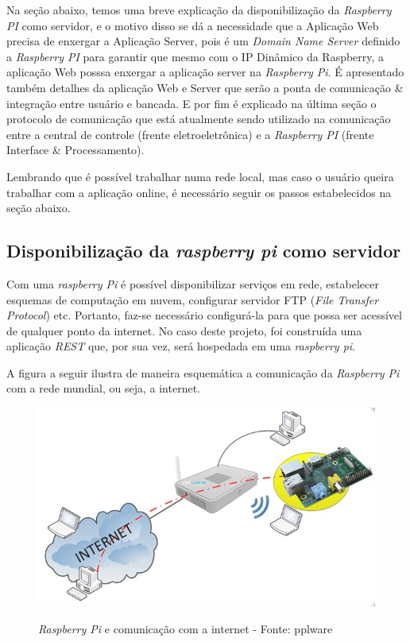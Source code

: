 Na seção abaixo, temos uma breve explicação da disponibilização da \textit{Raspberry PI} como servidor, e o motivo disso se dá a necessidade que a Aplicação Web precisa de enxergar a Aplicação Server, pois é um \textit{Domain Name Server} definido a \textit{Raspberry PI} para garantir que mesmo com o IP Dinâmico da Raspberry, a aplicação Web posssa enxergar a aplicação server na \textit{Raspberry Pi}. É apresentado também detalhes da aplicação Web e Server que serão a ponta de comunicação \& integração entre usuário e bancada. E por fim é explicado na última seção o protocolo de comunicação que está atualmente sendo utilizado na comunicação entre a central de controle (frente eletroeletrônica) e a \textit{Raspberry PI} (frente Interface \& Processamento).

Lembrando que é possível trabalhar numa rede local, mas caso o usuário queira trabalhar com a aplicação online, é necessário seguir os passos estabelecidos na seção abaixo.

\subsection{Disponibilização da \textit{raspberry pi} como servidor}

Com uma \textit{raspberry Pi} é possível disponibilizar serviços em rede, estabelecer esquemas de computação em nuvem, configurar servidor FTP (\textit{File Transfer Protocol}) etc. Portanto, faz-se necessário configurá-la para que possa ser acessível de qualquer ponto da internet. No caso deste projeto, foi construída uma aplicação \textit{REST} que, por sua vez, será hospedada em uma \textit{raspberry pi}.

A figura a seguir ilustra de maneira esquemática a comunicação da \textit{Raspberry Pi} com a rede mundial, ou seja, a internet.

\begin{figure}[H]
\centering
\includegraphics[keepaspectratio=true,scale=0.52]{figuras/raspberryeinternet.png}
\label{fig:raspberry_internet}
\caption{\textit{Raspberry Pi} e comunicação com a internet - Fonte: pplware}
\end{figure}

